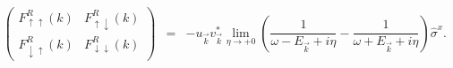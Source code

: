 \documentclass[uplatex,a4j,12pt,dvipdfmx]{jsarticle}
\begin{document}
\begin{eqnarray}
	\left(
	\begin{array}{cc}
			F_{\uparrow \uparrow}^{R}(k)   & F_{\uparrow \downarrow}^{R}(k)   \\[3mm]
			F_{\downarrow \uparrow}^{R}(k) & F_{\downarrow \downarrow}^{R}(k)
		\end{array}
	\right)
	&=&
	-
	u_{ \vec{k} }
	v_{ \vec{k} }^{*}
	\lim_{\eta \to +0}
	\left(
	\dfrac{ 1 }{ \omega - E_{\vec{k}} + i \eta }
	-
	\dfrac{ 1 }{ \omega + E_{\vec{k}} + i \eta }
	\right)
	\hat{\sigma}^{x}
	.
\end{eqnarray}
\end{document}
